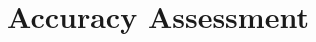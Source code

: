 
\lhead[\fancyplain{}{\leftmark}]%
      {\fancyplain{}{}} %
\chead[\fancyplain{}{}]%
      {\fancyplain{}{}}
\rhead[\fancyplain{}{}]%
      {\fancyplain{}{\rightmark}}%
\lfoot[\fancyplain{}{}]%
      {\fancyplain{}{}}
\cfoot[\fancyplain{}{\thepage}]%
      {\fancyplain{}{\thepage}} %
\rfoot[\fancyplain{}{}]%
     {\fancyplain{}{\scriptsize}}
     
\addto{}


\chapter{Accuracy Assessment}
\label{ch:5}


